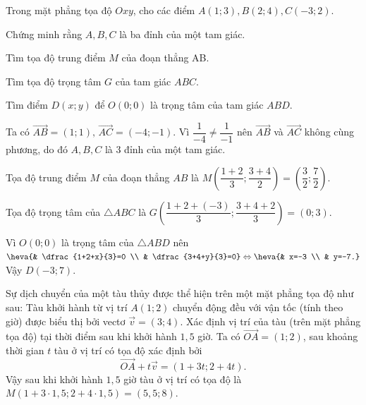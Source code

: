 \begin{bt}
	Trong mặt phẳng tọa độ $Oxy$, cho các điểm $A(1;3),B(2;4),C(-3;2)$.
	\begin{listEX}[1]
		\item Chứng minh rằng $A,B,C$ là ba đỉnh của một tam giác.
		\item Tìm tọa độ trung điểm $M$ của đoạn thẳng AB.
		\item Tìm tọa độ trọng tâm $G$ của tam giác $ABC$.
		\item Tìm điểm $D(x;y)$ để $O(0;0)$ là trọng tâm của tam giác $ABD$.
	\end{listEX}
	\loigiai
	{
			\begin{listEX}[1]
			\item Ta có $\overrightarrow{AB}=(1;1),\, \overrightarrow{AC}=(-4;-1)$. Vì $\dfrac{1}{-4}\ne \dfrac{1}{-1}$ nên $\overrightarrow{AB}$ và $\overrightarrow{AC}$ không cùng phương, do đó $A,B,C$ là 3 đỉnh của một tam giác.
			\item Tọa độ trung điểm $M$ của đoạn thẳng $AB$ là $M\left(\dfrac{1+2}{3};\dfrac{3+4}{2}\right)=\left(\dfrac{3}{2};\dfrac{7}{2}\right)$.
			\item Tọa độ trọng tâm của $\triangle ABC$ là $G\left(\dfrac{1+2+(-3)}{3};\dfrac{3+4+2}{3}\right)=(0;3)$.
			\item Vì $O(0;0)$ là trọng tâm của $\triangle ABD$ nên
			$\heva{& \dfrac{1+2+x}{3}=0 \\ & \dfrac{3+4+y}{3}=0}\Leftrightarrow \heva{& x=-3 \\ & y=-7.}$\\
			Vậy $D(-3;7)$.
		\end{listEX}
	}
\end{bt}
\begin{bt}
	Sự dịch chuyển của một tàu thủy được thể hiện trên một mặt phẳng tọa độ như sau: Tàu khởi hành từ vị trí $A(1;2)$ chuyển động đều với vận tốc (tính theo giờ) được biểu thị bởi vectơ $\overrightarrow{v}=(3;4)$. Xác định vị trí của tàu (trên mặt phẳng tọa độ) tại thời điểm sau khi khởi hành $1,5$ giờ.
	\loigiai
	{
	Ta có $\overrightarrow{OA}=(1;2)$, sau khoảng thời gian $t$ tàu ở vị trí có tọa độ xác định bởi $$\overrightarrow{OA}+t\overrightarrow{v}=(1+3t;2+4t).$$
	Vậy sau khi khởi hành $1,5$ giờ tàu ở vị trí có tọa độ là $M(1+3\cdot 1,5;2+4\cdot 1,5)=(5,5;8)$.
	}
\end{bt}

